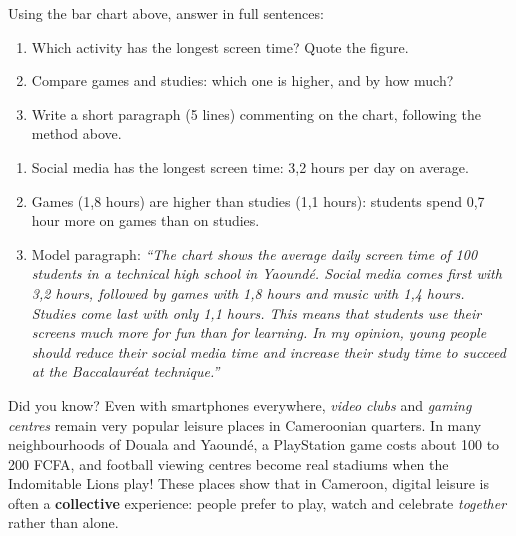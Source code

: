 \documentclass[11pt]{article}
\begin{document}
\begin{exercice}
Using the bar chart above, answer in full sentences:
\begin{enumerate}
\item Which activity has the longest screen time? Quote the figure.
\item Compare games and studies: which one is higher, and by how much?
\item Write a short paragraph (5 lines) commenting on the chart, following the method above.
\end{enumerate}
\end{exercice}

\begin{corrige}
\begin{enumerate}
\item Social media has the longest screen time: 3,2 hours per day on average.
\item Games (1,8 hours) are higher than studies (1,1 hours): students spend 0,7 hour more on games than on studies.
\item Model paragraph: \emph{``The chart shows the average daily screen time of 100 students in a technical high school in Yaoundé. Social media comes first with 3,2 hours, followed by games with 1,8 hours and music with 1,4 hours. Studies come last with only 1,1 hours. This means that students use their screens much more for fun than for learning. In my opinion, young people should reduce their social media time and increase their study time to succeed at the Baccalauréat technique.''}
\end{enumerate}
\end{corrige}

\begin{savaistu}
Did you know? Even with smartphones everywhere, \emph{video clubs} and \emph{gaming centres} remain very popular leisure places in Cameroonian quarters. In many neighbourhoods of Douala and Yaoundé, a PlayStation game costs about 100 to 200 FCFA, and football viewing centres become real stadiums when the Indomitable Lions play! These places show that in Cameroon, digital leisure is often a \textbf{collective} experience: people prefer to play, watch and celebrate \emph{together} rather than alone.
\end{savaistu}
\end{document}
